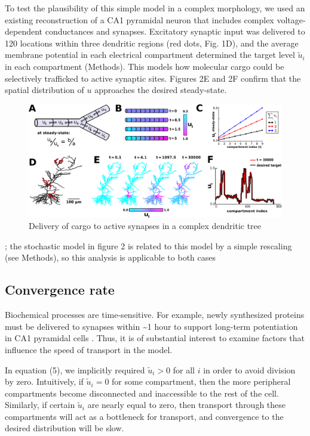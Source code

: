 \documentclass[fleqn,10pt]{wlpeerj}
\begin{document}
To test the plausibility of this simple model in a complex morphology, we used an existing reconstruction of a CA1 pyramidal neuron \citep{Migliore_2012} that includes complex voltage-dependent conductances and synapses. Excitatory synaptic input was delivered to 120 locations within three dendritic regions (red dots, Fig. 1D), and the average membrane potential in each electrical compartment determined the target level $\tilde{u}_i$ in each compartment (Methods). This models how molecular cargo could be selectively trafficked to active synaptic sites. Figures 2E and 2F confirm that the spatial distribution of $u$ approaches the desired steady-state.

\begin{figure}[h!]
\begin{center}
\includegraphics[width=1\columnwidth]{01_mass_action.png}
\caption{Delivery of cargo to active synapses in a complex dendritic tree}
\end{center}
\end{figure}

; the stochastic model in figure 2 is related to this model by a simple rescaling (see Methods), so this analysis is applicable to both cases

\subsection*{Convergence rate}

Biochemical processes are time-sensitive. For example, newly synthesized proteins must be delivered to synapses within \textasciitilde1 hour to support long-term potentiation in CA1 pyramidal cells \citep{Frey_1997,Frey_1998}. Thus, it is of substantial interest to examine factors that influence the speed of transport in the model.

In equation (5), we implicitly required $\tilde{u}_i > 0$ for all $i$ in order to avoid division by zero. Intuitively, if $\tilde{u}_i = 0$ for some compartment, then the more peripheral compartments become disconnected and inaccessible to the rest of the cell. Similarly, if certain $\tilde{u}_i$ are nearly equal to zero, then transport through these compartments will act as a bottleneck for transport, and convergence to the desired distribution will be slow.
\end{document}
